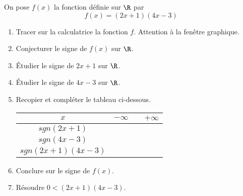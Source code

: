
On pose $f(x)$ la fonction définie sur $\R$ par $$f(x)=(2x+1)(4x-3)$$ 

\begin{enumerate}
\item Tracer sur la calculatrice la fonction $f$. Attention à la fenêtre graphique.
\item Conjecturer le signe de $f(x)$ sur $\R$.
\item Étudier le signe de $2x+1$ sur $\R$.
\item Étudier le signe de $4x-3$ sur $\R$.
\item Recopier et compléter le tableau ci-dessous.

\begin{tabular}{|c|p{1cm} >{\centering\arraybackslash}p{1cm} >{\raggedleft\arraybackslash}p{1cm}|}
\hline 
$x$ & $-\infty$ & & $+\infty$ \\ 
\hline 
$sgn(2x+1)$ &  &  &  \\ 
\hline 
$sgn(4x-3)$ &  &  &  \\ 
\hline 
$sgn(2x+1)(4x-3)$ &  &  &  \\ 
\hline 
\end{tabular} 

\item Conclure sur le signe de $f(x)$.
\item Résoudre $0<(2x+1)(4x-3)$.
\end{enumerate}